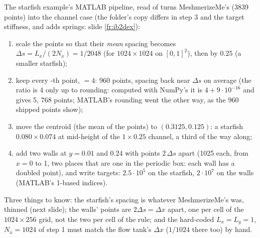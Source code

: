 \documentclass[aspectratio=169,11pt]{beamer}
\begin{document}
\begin{frame}{The starfish example's MATLAB pipeline, read}
\label{fr:pipeline}
\footnotesize
{} of  turns MeshmerizeMe's  (3839 points) into the channel case (the  folder's copy differs in step 3 and the target stiffness, and adds springs: slide \ref{fr:ib2dex}):
\begin{enumerate}
  \item scale the points so that their \emph{mean} spacing becomes $\Delta s = L_x/(2N_x) = 1/2048$ (for $1024 \times 1024$ on $[0, 1]^2$), then by $0.25$ (a smaller starfish);
  \item keep every -th point,  $= 4$: 960 points, spacing back near $\Delta s$ on average (the ratio is 4 only up to rounding: computed with NumPy's  it is $4 + 9 \cdot 10^{-16}$ and  gives 5, 768 points; MATLAB's rounding went the other way, as the 960 shipped points show);
  \item move the centroid (the mean of the points) to $(0.3125, 0.125)$: a starfish $0.080 \times 0.074$ at mid-height of the $1 \times 0.25$ channel, a third of the way along;
  \item add two walls at $y = 0.01$ and $0.24$ with points $2\,\Delta s$ apart (1025 each, from $x = 0$ to 1, two places that are one in the periodic box: each wall has a doubled point), and write targets: $2.5 \cdot 10^5$ on the starfish, $2 \cdot 10^7$ on the walls (MATLAB's 1-based indices).
\end{enumerate}
\begin{punchbox}
\small Three things to know: the starfish's spacing is whatever MeshmerizeMe's was, thinned (next slide); the walls' points are $2\Delta s = \Delta x$ apart, one per cell of the $1024 \times 256$ grid, not the two per cell of the rule; and the hard-coded $L_x = L_y = 1$, $N_x = 1024$ of step 1 must match the flow tank's $\Delta x$ ($1/1024$ there too) by hand.
\end{punchbox}
\end{frame}
\end{document}
